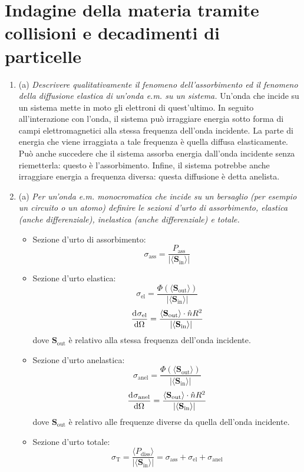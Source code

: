 \documentclass{article}
\renewcommand{\a}{(a)}
\renewcommand{\t}[1]{\textit{ #1}}
\renewcommand{\vec}[1]{\mathbf{#1}}
\begin{document}
		\section{Indagine della materia tramite collisioni e decadimenti di particelle}
		\begin{enumerate}
		\item\a\t{Descrivere qualitativamente il fenomeno dell'assorbimento ed il fenomeno della diffusione elastica di un'onda e.m. su un sistema.} Un'onda che incide su un sistema mette in moto gli elettroni di quest'ultimo. In seguito all'interazione con l'onda, il sistema può irraggiare energia sotto forma di campi elettromagnetici alla stessa frequenza dell'onda incidente. La parte di energia che viene irraggiata a tale frequenza è quella diffusa elasticamente. Può anche succedere che il sistema assorba energia dall'onda incidente senza riemetterla: questo è l'assorbimento. Infine, il sistema potrebbe anche irraggiare energia a frequenza diversa: questa diffusione è detta anelista.
		\item\a\t{Per un’onda e.m. monocromatica che incide su un bersaglio (per esempio un
			circuito o un atomo) definire le sezioni d’urto di assorbimento, elastica
			(anche differenziale), inelastica (anche differenziale) e totale.}
		\begin{itemize}
			\item Sezione d'urto di assorbimento:
			 \[\sigma_\textrm{ass}=\frac{P_\textrm{ass}}{|\langle\vec{S}_\textrm{in}\rangle|}\]
			\item Sezione d'urto elastica:
			\[\sigma_\textrm{el}=\frac{\Phi(\langle\vec{S}_\textrm{out}\rangle)}{|\langle\vec{S}_\textrm{in}\rangle|}\]
			\[\der{\sigma_\textrm{el}}{\Omega}=\frac{\langle\vec{S}_\textrm{out}\rangle\cdot\hat{n}R^2}{|\langle\vec{S}_\textrm{in}\rangle|}\]
			dove $\vec{S}_\textrm{out}$ è relativo alla stessa frequenza dell'onda incidente.
			\item Sezione d'urto anelastica:
			\[\sigma_\textrm{anel}=\frac{\Phi(\langle\vec{S}_\textrm{out}\rangle)}{|\langle\vec{S}_\textrm{in}\rangle|}\]
			\[\der{\sigma_\textrm{anel}}{\Omega}=\frac{\langle\vec{S}_\textrm{out}\rangle\cdot\hat{n}R^2}{|\langle\vec{S}_\textrm{in}\rangle|}\]
			dove $\vec{S}_\textrm{out}$ è relativo alle frequenze diverse da quella dell'onda incidente.
			\item Sezione d'urto totale:
			\[\sigma_\textrm{T}=\frac{\langle P_\textrm{diss}\rangle}{|\langle\vec{S}_\textrm{in}\rangle|}=\sigma_\textrm{ass}+\sigma_\textrm{el}+\sigma_\textrm{anel}\]
		\end{itemize}

\end{enumerate}
\end{document}
